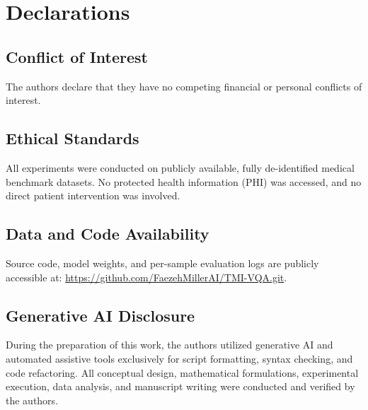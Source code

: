 \documentclass[journal,twoside,web]{ieeecolor}
\begin{document}
\section*{Declarations}
\subsection*{Conflict of Interest}
The authors declare that they have no competing financial or personal conflicts of interest.
\subsection*{Ethical Standards}
All experiments were conducted on publicly available, fully de-identified medical benchmark datasets. No protected health information (PHI) was accessed, and no direct patient intervention was involved.
\subsection*{Data and Code Availability}
Source code, model weights, and per-sample evaluation logs are publicly accessible at: \url{https://github.com/FaezehMillerAI/TMI-VQA.git}.
\subsection*{Generative AI Disclosure}
During the preparation of this work, the authors utilized generative AI and automated assistive tools exclusively for script formatting, syntax checking, and code refactoring. All conceptual design, mathematical formulations, experimental execution, data analysis, and manuscript writing were conducted and verified by the authors.
\end{document}
